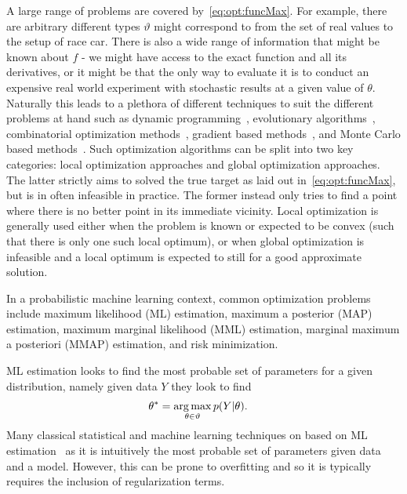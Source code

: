 A large range of problems are covered by~\eqref{eq:opt:funcMax}.  For example, 
there are arbitrary different types $\vartheta$ might correspond to from the set of real
values to the setup of race car.  There is also a wide range of information that might
be known about $f$ - we might have access to the exact function and all its derivatives,
or it might be that the only way to evaluate it is to conduct an expensive real world 
experiment with stochastic results at a given value of $\theta$.  Naturally this leads 
to a plethora of different techniques to suit the different problems at hand such
as dynamic programming~\citep{bellman2013dynamic}, evolutionary 
algorithms~\citep{back1996evolutionary}, combinatorial optimization 
methods~\citep{papadimitriou1982combinatorial}, gradient based 
methods~\citep{boyd2004convex}, and Monte Carlo based methods~\citep{robert2004monte}.
Such optimization algorithms can be split into two key categories:
local optimization approaches and global optimization approaches.  
The latter strictly aims to solved the true target as laid out in~\eqref{eq:opt:funcMax}, but
is in often infeasible in practice.
The former instead only tries to find a point where there is no better point in its immediate vicinity. 
Local optimization is generally
used either when the problem is known or expected to be convex (such that there is only
one such local optimum), or when global optimization is infeasible and a local
optimum is expected to still for a good approximate solution.  

In a probabilistic machine learning context, common optimization problems 
include maximum likelihood (ML) estimation,
maximum a posterior (MAP) estimation, maximum marginal likelihood (MML) estimation, 
marginal maximum a posteriori (MMAP) estimation,
and risk minimization.  

ML estimation looks to find the most probable set of parameters
for a given distribution, namely given data $Y$ they look to find
\begin{align}
\label{eq:opt:max-lik}
\theta^* &= \operatorname*{arg\,max}_{\theta \in \vartheta} p(Y|\theta).
\end{align}
Many classical statistical and machine learning techniques on based on 
ML estimation~\citep{hastie01statisticallearning} as it is intuitively the most probable
set of parameters given data and a model.  However, this can be prone to overfitting and
so it is typically requires the inclusion of regularization terms.

